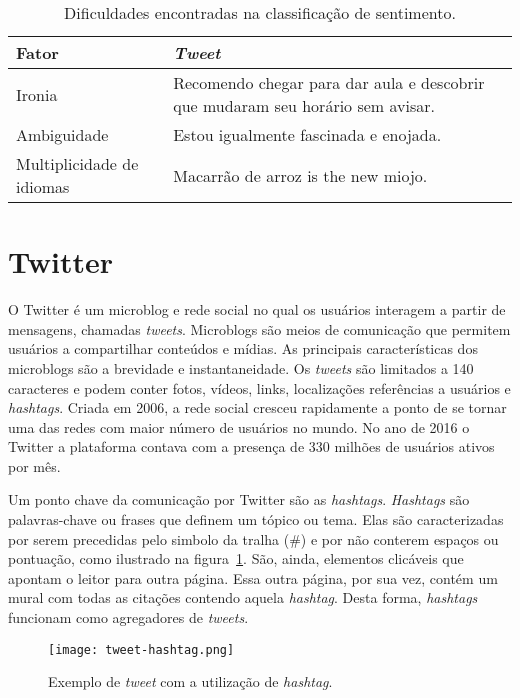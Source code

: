 \begin{table}[h]
    \begin{center}
        \begin{tabular}{| l | p{10cm} |}
        \hline
        \textbf{Fator} & \textbf{\textit{Tweet}} \\ \hline
        Ironia & Recomendo chegar para dar aula e descobrir que mudaram seu horário sem avisar. \\ \hline
        Ambiguidade & Estou igualmente fascinada e enojada. \\ \hline
        Multiplicidade de idiomas & Macarrão de arroz is the new miojo. \\ \hline
        \end{tabular}
        \caption{Dificuldades encontradas na classificação de sentimento.}
        \label{tab:sentiment_complexity}
    \end{center}
\end{table}

\section{Twitter}

O Twitter é um microblog e rede social no qual os usuários interagem a partir de mensagens, chamadas \textit{tweets}.
Microblogs são meios de comunicação que permitem usuários a compartilhar conteúdos e mídias.
As principais características dos microblogs são a brevidade e instantaneidade.
Os \textit{tweets} são limitados a 140 caracteres e podem conter fotos, vídeos, links, localizações referências a
usuários e \textit{hashtags}.
Criada em 2006, a rede social cresceu rapidamente a ponto de se tornar uma das redes com maior número de usuários no
mundo.
No ano de 2016 o Twitter a plataforma contava com a presença de 330 milhões de usuários ativos por mês.

Um ponto chave da comunicação por Twitter são as \textit{hashtags}.
\textit{Hashtags} são palavras-chave ou frases que definem um tópico ou tema.
Elas são caracterizadas por serem precedidas pelo simbolo da tralha (\#) e por não conterem espaços ou pontuação, como
ilustrado na figura~\ref{fig:hashtag}.
São, ainda, elementos clicáveis que apontam o leitor para outra página.
Essa outra página, por sua vez, contém um mural com todas as citações contendo aquela \textit{hashtag}.
Desta forma, \textit{hashtags} funcionam como agregadores de \textit{tweets}.

\begin{figure}
\begin{center} {
    \begin{center}
    \texttt{[image: tweet-hashtag.png]}
    \caption{Exemplo de \textit{tweet} com a utilização de \textit{hashtag}.}
    \label{fig:hashtag}
    \end{center}
}
\end{center}
\end{figure}

